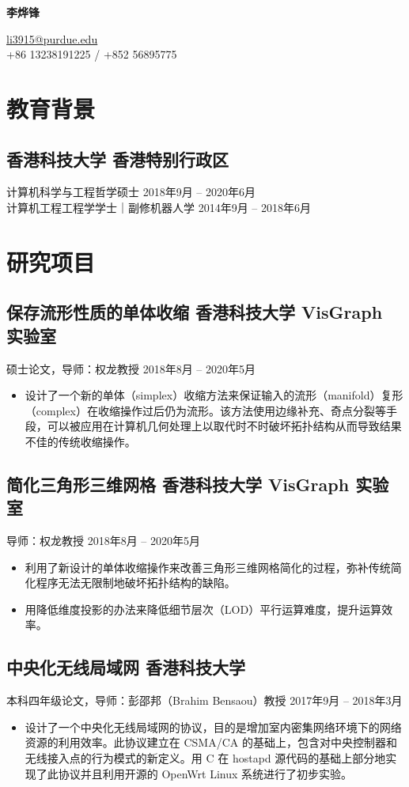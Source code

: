\documentclass[
  10pt,           %
  autoindent=0pt, %
  scheme=plain,   %
]{ctexart}
\newcommand{\subsec}[2]{\subsection*{#1 \hfill {\normalfont #2}}}
\newcommand{\subsecdesc}[2]{{\kaishu #1 \hfill #2}}
\begin{document}
\begin{center}
{\LARGE\bfseries 李烨锋}
\vspace{4pt}

{\small\ttfamily
  \href{mailto:li3915@purdue.edu}{li3915@purdue.edu} \\
  +86 13238191225 / +852 56895775
}
\end{center}

\section*{教育背景} %

  \subsec{香港科技大学}{香港特别行政区}
  \subsecdesc{计算机科学与工程哲学硕士}{2018年9月 -- 2020年6月} \\
  \subsecdesc{计算机工程工程学学士｜副修机器人学}{2014年9月 -- 2018年6月}

\section*{研究项目} %

  \subsec{保存流形性质的单体收缩}{香港科技大学 VisGraph 实验室}
  \subsecdesc{硕士论文，导师：权龙教授}{2018年8月 -- 2020年5月}
  \begin{itemize}
    \item 设计了一个新的单体（simplex）收缩方法来保证输入的流形（manifold）复形（complex）在收缩操作过后仍为流形。该方法使用边缘补充、奇点分裂等手段，可以被应用在计算机几何处理上以取代时不时破坏拓扑结构从而导致结果不佳的传统收缩操作。
  \end{itemize}

  \subsec{简化三角形三维网格}{香港科技大学 VisGraph 实验室}
  \subsecdesc{导师：权龙教授}{2018年8月 -- 2020年5月}
  \begin{itemize}
    \item 利用了新设计的单体收缩操作来改善三角形三维网格简化的过程，弥补传统简化程序无法无限制地破坏拓扑结构的缺陷。
    \item 用降低维度投影的办法来降低细节层次（LOD）平行运算难度，提升运算效率。
  \end{itemize}

  \subsec{中央化无线局域网}{香港科技大学}
  \subsecdesc{本科四年级论文，导师：彭邵邦（Brahim Bensaou）教授}{2017年9月 -- 2018年3月}
  \begin{itemize}
    \item 设计了一个中央化无线局域网的协议，目的是增加室内密集网络环境下的网络资源的利用效率。此协议建立在 CSMA/CA 的基础上，包含对中央控制器和无线接入点的行为模式的新定义。用 C 在 hostapd 源代码的基础上部分地实现了此协议并且利用开源的 OpenWrt Linux 系统进行了初步实验。
  \end{itemize}
\end{document}
